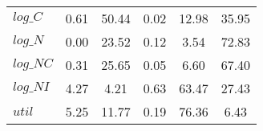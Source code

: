 \begin{center}
\begin{longtable}{lccccc}
$log\_C          $	 & 	        0.61	 & 	       50.44	 & 	        0.02	 & 	       12.98	 & 	       35.95 \\ 
$log\_N          $	 & 	        0.00	 & 	       23.52	 & 	        0.12	 & 	        3.54	 & 	       72.83 \\ 
$log\_NC         $	 & 	        0.31	 & 	       25.65	 & 	        0.05	 & 	        6.60	 & 	       67.40 \\ 
$log\_NI         $	 & 	        4.27	 & 	        4.21	 & 	        0.63	 & 	       63.47	 & 	       27.43 \\ 
${util}          $	 & 	        5.25	 & 	       11.77	 & 	        0.19	 & 	       76.36	 & 	        6.43 \\ 
\end{longtable}
 \end{center}
